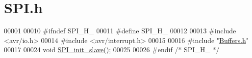 \hypertarget{kommunikation_2komm__modul_2komm__modul_2_s_p_i_8h_source}{}\section{S\+P\+I.\+h}
\label{kommunikation_2komm__modul_2komm__modul_2_s_p_i_8h_source}

\begin{DoxyCode}
00001 
00010 \textcolor{preprocessor}{#ifndef SPI\_H\_}
00011 \textcolor{preprocessor}{#define SPI\_H\_}
00012 
00013 \textcolor{preprocessor}{#include <avr/io.h>}
00014 \textcolor{preprocessor}{#include <avr/interrupt.h>}
00015 
00016 \textcolor{preprocessor}{#include "\hyperlink{_buffers_8h}{Buffers.h}"}
00017 
00024 \textcolor{keywordtype}{void} \hyperlink{kommunikation_2komm__modul_2komm__modul_2_s_p_i_8h_a9208b9a00dfa335b5dd56360ea5c7813}{SPI\_init\_slave}();
00025 
00026 \textcolor{preprocessor}{#endif }\textcolor{comment}{/* SPI\_H\_ */}\textcolor{preprocessor}{}
\end{DoxyCode}
